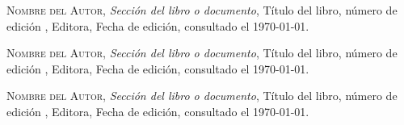 \begin{thebibliography}{1}

\textsc{Nombre del Autor}, \textit{Sección del libro o documento},  Título del libro, número de edición , Editora, Fecha de edición, consultado el \today.

\textsc{Nombre del Autor}, \textit{Sección del libro o documento},  Título del libro, número de edición , Editora, Fecha de edición, consultado el \today.

\textsc{Nombre del Autor}, \textit{Sección del libro o documento},  Título del libro, número de edición , Editora, Fecha de edición, consultado el \today.


\end{thebibliography}